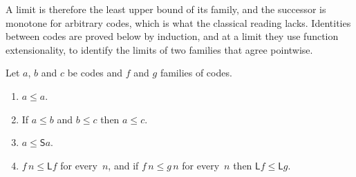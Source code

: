 \documentclass[11pt]{amsart}
\makeatletter
\newcommand{\bS}{\mathsf{S}}
\newcommand{\bL}{\mathsf{L}}
\newif\ifagdarefs
\newcommand{\AgdaRefs}[1]{\ifagdarefs{\footnotesize\color{agdablue}(#1)}\else\unskip\fi}
\newcommand{\Agda}[2]{{\footnotesize\color{agdablue}\textsf{#1}%
  \ifblank{#2}{}{\texttt{.}\allowbreak\texttt{#2}}}}
\let\ttt@plain\texttt
\renewcommand{\texttt}[1]{{\footnotesize\color{agdablue}\ttt@plain{#1}}}
\theoremstyle{plain}
\theoremstyle{definition}
\makeatother
\begin{document}
A limit is therefore the least upper bound of its family, and the
successor is monotone for arbitrary codes, which is what the classical
reading lacks. Identities between codes are proved below by induction,
and at a limit they use function extensionality, to identify the
limits of two families that agree pointwise.

\begin{lemma}
\label{lem:order}
Let $a$, $b$ and $c$ be codes and $f$ and $g$ families of codes.
\begin{enumerate}
\item\label{item:refl}
  $a \le a$.
\item\label{item:trans}
  If $a \le b$ and $b \le c$ then $a \le c$.
\item\label{item:S-incr}
  $a \le \bS a$.
\item\label{item:L-mono}
  $f\,n \le \bL f$ for every~$n$, and if $f\,n \le g\,n$ for every~$n$
  then $\bL f \le \bL g$.
\end{enumerate}
\AgdaRefs{\Agda{BrouwerOrdinals.Order}{≤-refl}; \texttt{≤-trans},
\texttt{≤-L-mono}, \texttt{≤-L-upper-bound};
\Agda{BrouwerOrdinals.Epsilon0}{S-increasing}.}
\end{lemma}
\end{document}
